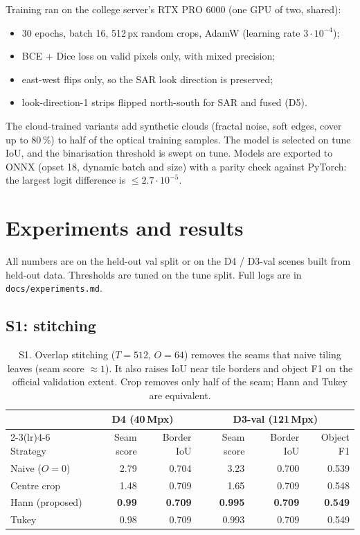 \documentclass[11pt,a4paper]{article}
\begin{document}
Training ran on the college server's RTX PRO 6000 (one GPU of two, shared):
\begin{itemize}
\item 30 epochs, batch 16, 512\,px random crops, AdamW (learning rate $3\cdot10^{-4}$);
\item BCE + Dice loss on valid pixels only, with mixed precision;
\item east-west flips only, so the SAR look direction is preserved;
\item look-direction-1 strips flipped north-south for SAR and fused (D5).
\end{itemize}
The cloud-trained variants add synthetic clouds (fractal noise, soft edges, cover up to
80\,\%) to half of the optical training samples. The model is selected on tune IoU, and the
binarisation threshold is swept on tune. Models are exported to ONNX (opset 18, dynamic
batch and size) with a parity check against PyTorch: the largest logit difference is
$\le 2.7\cdot10^{-5}$.

\section{Experiments and results}
\label{sec:results}
All numbers are on the held-out val split or on the D4 / D3-val scenes built from held-out
data. Thresholds are tuned on the tune split. Full logs are in \texttt{docs/experiments.md}.

\subsection{S1: stitching}
\begin{table}[h]
\centering\small
\begin{tabular}{lrrrrr}
\toprule
& \multicolumn{2}{c}{D4 (40\,Mpx)} & \multicolumn{3}{c}{D3-val (121\,Mpx)}\\
\cmidrule(lr){2-3}\cmidrule(lr){4-6}
Strategy & Seam score & Border IoU & Seam score & Border IoU & Object F1\\
\midrule
Naive ($O=0$) & 2.79 & 0.704 & 3.23 & 0.700 & 0.539\\
Centre crop & 1.48 & 0.709 & 1.65 & 0.709 & 0.548\\
Hann (proposed) & \textbf{0.99} & \textbf{0.709} & \textbf{0.995} & \textbf{0.709} & \textbf{0.549}\\
Tukey & 0.98 & 0.709 & 0.993 & 0.709 & 0.549\\
\bottomrule
\end{tabular}
\caption{S1. Overlap stitching ($T=512$, $O=64$) removes the seams that naive tiling
leaves (seam score $\approx 1$). It also raises IoU near tile borders and object F1 on the
official validation extent. Crop removes only half of the seam; Hann and Tukey are
equivalent.}
\end{table}
\end{document}
